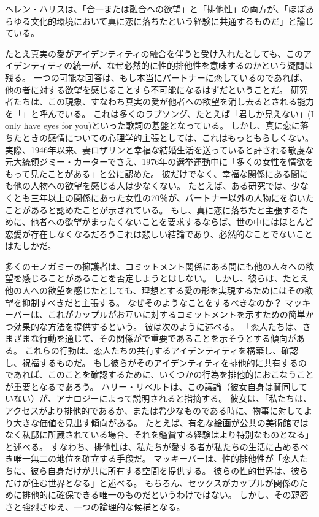 \documentclass[paper=a4,book,openany]{jlreq} \usepackage{mystyle}
\begin{document}
ヘレン・ハリスは、「合一または融合への欲望」と「排他性」の両方が、「ほぼあらゆる文化的環境において真に恋に落ちたという経験に共通するものだ」と論じている\citep[pp. 102--103]{harris95:_rethin_polyn_heter_relat}。

たとえ真実の愛がアイデンティティの融合を伴うと受け入れたとしても、このアイデンティティの統一が、なぜ必然的に性的排他性を意味するのかという疑問は残る。
一つの可能な回答は、もし本当にパートナーに恋しているのであれば、他の者に対する欲望を感じることすら不可能になるはずだということだ。
研究者たちは、この現象、すなわち真実の愛が他者への欲望を消し去るとされる能力を「」と呼んでいる。
これは多くのラブソング、たとえば「君しか見えない」(I only have eyes for you)といった歌詞の基盤となっている。
しかし、真に恋に落ちたときの感情についての心理学的主張としては、これはもっともらしくない。
実際、1946年以来、妻ロザリンと幸福な結婚生活を送っていると評される敬虔な元大統領ジミー・カーターでさえ、1976年の選挙運動中に「多くの女性を情欲をもって見たことがある」と公に認めた。
彼だけでなく、幸福な関係にある間にも他の人物への欲望を感じる人は少なくない。
たとえば、ある研究では、少なくとも三年以上の関係にあった女性の70％が、パートナー以外の人物にを抱いたことがあると認めたことが示されている\citep{barnhart16:_women_exper_feelin_attrac_someon}。
もし、真に恋に落ちたと主張するために、他者への欲望がまったくないことを要求するならば、世の中にはほとんど恋愛が存在しなくなるだろう{\DDASH}これは悲しい結論であり、必然的なことでないことはたしかだ。

多くのモノガミーの擁護者は、コミットメント関係にある間にも他の人々への欲望を感じることがあることを否定しようとはしない。
しかし、彼らは、たとえ他の人への欲望を感じたとしても、理想とする愛の形を実現するためにはその欲望を抑制すべきだと主張する。
なぜそのようなことをするべきなのか？ マッキーバーは、これがカップルがお互いに対するコミットメントを示すための簡単かつ効果的な方法を提供するという。
彼は次のように述べる。
「恋人たちは、さまざまな行動を通じて、その関係がで重要であることを示そうとする傾向がある。
これらの行動は、恋人たちの共有するアイデンティティを構築し、確認し、祝福するものだ。
もし彼らがそのアイデンティティを排他的に共有するのであれば、このことを確認するために、いくつかの行為を排他的におこなうことが重要となるであろう\citep[p.361]{mckeever17:_is_requir_sexual_exclus_consis_roman_love}。
ハリー・リベルトは、この議論（彼女自身は賛同していない）が、アナロジーによって説明されると指摘する。
彼女は、「私たちは、アクセスがより排他的であるか、または希少なものである時に、物事に対してより大きな価値を見出す傾向がある。
たとえば、有名な絵画が公共の美術館ではなく私邸に所蔵されている場合、それを鑑賞する経験はより特別なものとなる」と述べる\citep[p.410]{liberto17:_prob_sexual_prom}。
すなわち、排他性は、私たちが愛する者が私たちの生活に占めるべき唯一無二の地位を確立する手段だ。
マッキーバーは、性的排他性が「恋人たちに、彼ら自身だけが共に所有する空間を提供する。
彼らの性的世界は、彼らだけが住む世界となる」と述べる\citep[p.61]{mckeever17:_is_requir_sexual_exclus_consis_roman_love}。
もちろん、セックスがカップルが関係のために排他的に確保できる唯一のものだというわけではない。
しかし、その親密さと強烈さゆえ、一つの論理的な候補となる\citep[p.6]{york19:_why_monog_is_moral_permis}。
\end{document}
